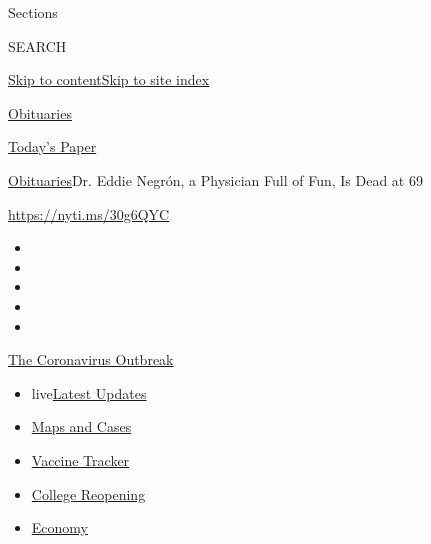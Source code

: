 Sections

SEARCH

\protect\hyperlink{site-content}{Skip to
content}\protect\hyperlink{site-index}{Skip to site index}

\href{https://www.nytimes.com/section/obituaries}{Obituaries}

\href{https://myaccount.nytimes.com/auth/login?response_type=cookie\&client_id=vi}{}

\href{https://www.nytimes.com/section/todayspaper}{Today's Paper}

\href{/section/obituaries}{Obituaries}\textbar{}Dr. Eddie Negrón, a
Physician Full of Fun, Is Dead at 69

\url{https://nyti.ms/30g6QYC}

\begin{itemize}
\item
\item
\item
\item
\item
\end{itemize}

\href{https://www.nytimes.com/news-event/coronavirus?action=click\&pgtype=Article\&state=default\&region=TOP_BANNER\&context=storylines_menu}{The
Coronavirus Outbreak}

\begin{itemize}
\tightlist
\item
  live\href{https://www.nytimes.com/2020/08/03/world/coronavirus-covid-19.html?action=click\&pgtype=Article\&state=default\&region=TOP_BANNER\&context=storylines_menu}{Latest
  Updates}
\item
  \href{https://www.nytimes.com/interactive/2020/us/coronavirus-us-cases.html?action=click\&pgtype=Article\&state=default\&region=TOP_BANNER\&context=storylines_menu}{Maps
  and Cases}
\item
  \href{https://www.nytimes.com/interactive/2020/science/coronavirus-vaccine-tracker.html?action=click\&pgtype=Article\&state=default\&region=TOP_BANNER\&context=storylines_menu}{Vaccine
  Tracker}
\item
  \href{https://www.nytimes.com/2020/08/02/us/covid-college-reopening.html?action=click\&pgtype=Article\&state=default\&region=TOP_BANNER\&context=storylines_menu}{College
  Reopening}
\item
  \href{https://www.nytimes.com/live/2020/08/03/business/stock-market-today-coronavirus?action=click\&pgtype=Article\&state=default\&region=TOP_BANNER\&context=storylines_menu}{Economy}
\end{itemize}

